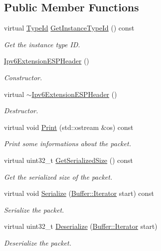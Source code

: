 \subsection*{Public Member Functions}
\begin{DoxyCompactItemize}
\item 
virtual \hyperlink{classns3_1_1TypeId}{Type\+Id} \hyperlink{classns3_1_1Ipv6ExtensionESPHeader_abaca91af68a4c3a6bae6ec12899d03b0}{Get\+Instance\+Type\+Id} () const 
\begin{DoxyCompactList}\small\item\em Get the instance type ID. \end{DoxyCompactList}\item 
\hyperlink{classns3_1_1Ipv6ExtensionESPHeader_ae77d023bbcb572e5dbe0cfd4ad767049}{Ipv6\+Extension\+E\+S\+P\+Header} ()
\begin{DoxyCompactList}\small\item\em Constructor. \end{DoxyCompactList}\item 
virtual \hyperlink{classns3_1_1Ipv6ExtensionESPHeader_a3594c7f32eb1fc840d1a3f707d7aaacc}{$\sim$\+Ipv6\+Extension\+E\+S\+P\+Header} ()
\begin{DoxyCompactList}\small\item\em Destructor. \end{DoxyCompactList}\item 
virtual void \hyperlink{classns3_1_1Ipv6ExtensionESPHeader_ab06332230e012469a79baff4ff58ea10}{Print} (std\+::ostream \&os) const 
\begin{DoxyCompactList}\small\item\em Print some informations about the packet. \end{DoxyCompactList}\item 
virtual uint32\+\_\+t \hyperlink{classns3_1_1Ipv6ExtensionESPHeader_a2b45bc93abd4ffc3d79dbb0cfe918357}{Get\+Serialized\+Size} () const 
\begin{DoxyCompactList}\small\item\em Get the serialized size of the packet. \end{DoxyCompactList}\item 
virtual void \hyperlink{classns3_1_1Ipv6ExtensionESPHeader_a750e9ec634479cf7cc46d3dbe3870f84}{Serialize} (\hyperlink{classns3_1_1Buffer_1_1Iterator}{Buffer\+::\+Iterator} start) const 
\begin{DoxyCompactList}\small\item\em Serialize the packet. \end{DoxyCompactList}\item 
virtual uint32\+\_\+t \hyperlink{classns3_1_1Ipv6ExtensionESPHeader_afae36dcc2dcbd51b1a46dfef5d430142}{Deserialize} (\hyperlink{classns3_1_1Buffer_1_1Iterator}{Buffer\+::\+Iterator} start)
\begin{DoxyCompactList}\small\item\em Deserialize the packet. \end{DoxyCompactList}\end{DoxyCompactItemize}
